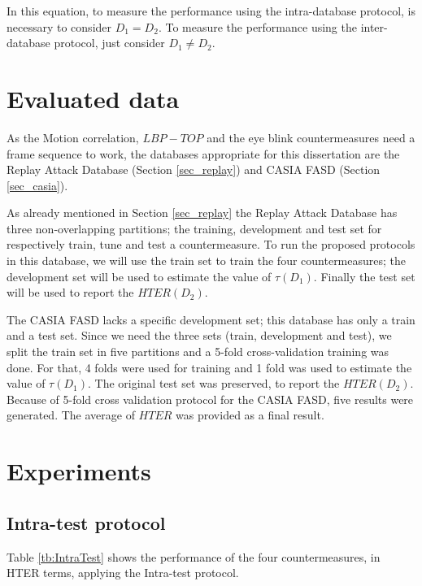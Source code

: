 In this equation, to measure the performance using the intra-database protocol, is necessary to consider $D_1 = D_2$. To measure the performance using the inter-database protocol, just consider $D_1 \neq D_2$.


\section{Evaluated data}
\label{sec:data}

As the Motion correlation, $LBP-TOP$ and the eye blink countermeasures need a frame sequence to work, the databases appropriate for this dissertation are the Replay Attack Database (Section \ref{sec_replay}) and CASIA FASD (Section \ref{sec_casia}).

As already mentioned in Section \ref{sec_replay} the Replay Attack Database has three non-overlapping partitions; the training, development and test set for respectively train, tune and test a countermeasure. To run the proposed protocols in this database, we will use the train set to train the four countermeasures; the development set will be used to estimate the value of $\tau(D_1)$. Finally the test set will be used to report the $HTER(D_2)$.

The CASIA FASD lacks a specific development set; this database has only a train and a test set. Since we need the three sets (train, development and test), we split the train set in five partitions and a 5-fold cross-validation training was done. For that, 4 folds were used for training and 1 fold was used to estimate the value of $\tau(D_1)$. The original test set was preserved, to report the $HTER(D_2)$. Because of 5-fold cross validation protocol for the CASIA FASD, five results were generated. The average of $HTER$ was provided as a final result.






\section{Experiments}
\label{sec:Comparative_experiments}

\subsection{Intra-test protocol}
\label{sec:Intra_test}

Table \ref{tb:IntraTest} shows the performance of the four countermeasures, in HTER terms, applying the Intra-test protocol.

